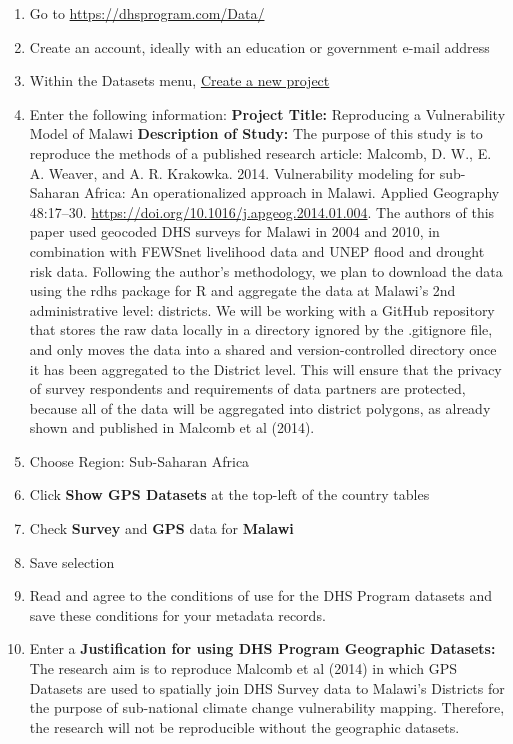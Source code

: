 \documentclass[
]{article}
\providecommand{\tightlist}{%
  \setlength{\itemsep}{0pt}\setlength{\parskip}{0pt}}
\begin{document}
\begin{enumerate}
\def\labelenumi{\arabic{enumi}.}
\tightlist
\item
  Go to \url{https://dhsprogram.com/Data/}
\item
  Create an account, ideally with an education or government e-mail
  address
\item
  Within the Datasets menu,
  \href{https://dhsprogram.com/data/dataset_admin/index.cfm?action=createproject}{Create
  a new project}
\item
  Enter the following information: \textbf{Project Title:} Reproducing a
  Vulnerability Model of Malawi \textbf{Description of Study:} The
  purpose of this study is to reproduce the methods of a published
  research article: Malcomb, D. W., E. A. Weaver, and A. R. Krakowka.
  2014. Vulnerability modeling for sub-Saharan Africa: An
  operationalized approach in Malawi. Applied Geography 48:17--30.
  \url{https://doi.org/10.1016/j.apgeog.2014.01.004}. The authors of
  this paper used geocoded DHS surveys for Malawi in 2004 and 2010, in
  combination with FEWSnet livelihood data and UNEP flood and drought
  risk data. Following the author's methodology, we plan to download the
  data using the rdhs package for R and aggregate the data at Malawi's
  2nd administrative level: districts. We will be working with a GitHub
  repository that stores the raw data locally in a directory ignored by
  the .gitignore file, and only moves the data into a shared and
  version-controlled directory once it has been aggregated to the
  District level. This will ensure that the privacy of survey
  respondents and requirements of data partners are protected, because
  all of the data will be aggregated into district polygons, as already
  shown and published in Malcomb et al (2014).
\item
  Choose Region: Sub-Saharan Africa
\item
  Click \textbf{Show GPS Datasets} at the top-left of the country tables
\item
  Check \textbf{Survey} and \textbf{GPS} data for \textbf{Malawi}
\item
  Save selection
\item
  Read and agree to the conditions of use for the DHS Program datasets
  and save these conditions for your metadata records.
\item
  Enter a \textbf{Justification for using DHS Program Geographic
  Datasets:} The research aim is to reproduce Malcomb et al (2014) in
  which GPS Datasets are used to spatially join DHS Survey data to
  Malawi's Districts for the purpose of sub-national climate change
  vulnerability mapping. Therefore, the research will not be
  reproducible without the geographic datasets.
\end{enumerate}
\end{document}
